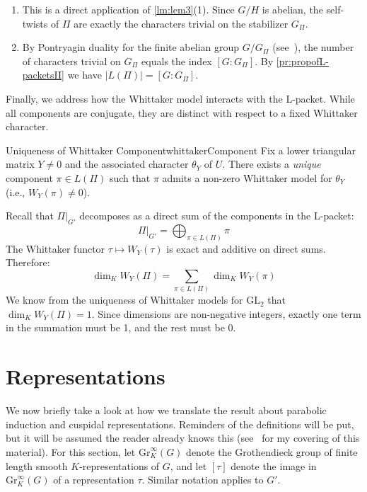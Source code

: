 \documentclass{article}
\begin{document}
\begin{Proof}
  \begin{enumerate}
      \item This is a direct application of \cref{lm:lem3}(1). Since \(G/H\) is abelian, the self-twists of \(\Pi\) are exactly the characters trivial on the stabilizer \(G_\Pi\).
      \item By Pontryagin duality  for the finite abelian group \(G/G_\Pi\)
        (see~\cite{chwojko-srawleyPontryaginDuality}), the number of characters trivial on \(G_\Pi\) equals
        the index \([G:G_\Pi]\). By \cref{pr:propofL-packetsII} we have \(|L(\Pi)| = [G:G_\Pi]\).
  \end{enumerate}
\end{Proof}

Finally, we address how the Whittaker model interacts with the L-packet. While all components are conjugate, they are distinct with respect to a fixed Whittaker character.

\begin{prop}{Uniqueness of Whittaker Component}{whittakerComponent}
  Fix a lower triangular matrix \(Y \neq 0\) and the associated character \(\theta_Y\) of \(U\).
  There exists a \emph{unique} component \(\pi \in L(\Pi)\) such that \(\pi\) admits a non-zero Whittaker model for \(\theta_Y\) (i.e., \(W_Y(\pi) \neq 0\)).
\end{prop}

\begin{Proof}
  Recall that \(\Pi|_{G'}\) decomposes as a direct sum of the components in the L-packet:
  \[ \Pi|_{G'} = \bigoplus_{\pi \in L(\Pi)} \pi \]
  The Whittaker functor \(\tau \mapsto W_Y(\tau)\) is exact and additive on direct sums. Therefore:
  \[ \dim_K W_Y(\Pi) = \sum_{\pi \in L(\Pi)} \dim_K W_Y(\pi) \]
  We know from the uniqueness of Whittaker models for \(\mathrm{GL}_2\) that \(\dim_K W_Y(\Pi) = 1\).
  Since dimensions are non-negative integers, exactly one term in the summation must be 1, and the rest must be 0.
\end{Proof}



\section{Representations}

We now briefly take a look at how we translate the result about parabolic induction and cuspidal
representations. Reminders of the definitions will be put, but it will be assumed the reader already knows
this (see~\cite{NatePadicRep} for my covering of this material). For this section, let \(\mathrm{Gr}_K^\infty(G)\) denote the Grothendieck group of finite
length smooth \(K\)-representations of \(G\), and let \([\tau]\) denote the image in
\(\mathrm{Gr}_K^\infty(G)\) of a representation \(\tau\). Similar notation applies to \(G'\).
\end{document}
